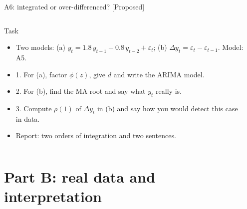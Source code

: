 \begin{frame}{A6: integrated or over-differenced? [Proposed]}
\propsub
\itemsize{\scriptsize}
\begin{columns}[T]
\begin{column}{\taskw}
\begin{block}{Task}
\begin{itemize}
    \item Two models: (a) $y_t = 1.8\,y_{t-1} - 0.8\,y_{t-2} + \varepsilon_t$; (b) $\Delta y_t = \varepsilon_t - \varepsilon_{t-1}$. Model: A5.
    \item 1. For (a), factor $\phi(z)$, give $d$ and write the ARIMA model.
    \item 2. For (b), find the MA root and say what $y_t$ really is.
    \item 3. Compute $\rho(1)$ of $\Delta y_t$ in (b) and say how you would detect this case in data.
    \item Report: two orders of integration and two sentences.
\end{itemize}
\end{block}
\end{column}
\begin{column}{\solw}
\end{column}
\end{columns}
\end{frame}


\section{Part B: real data and interpretation}

